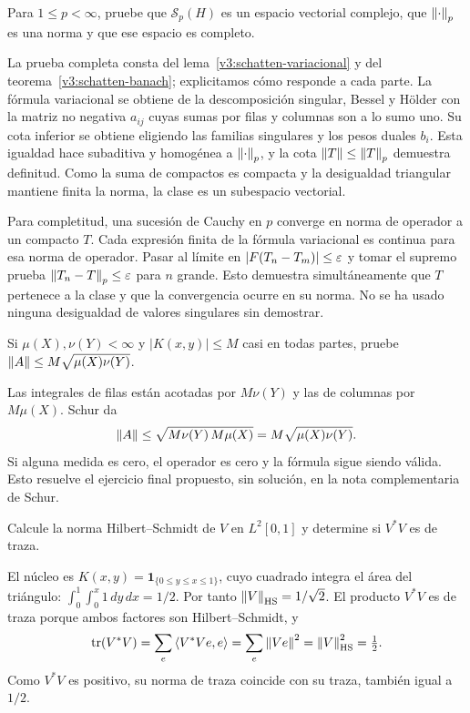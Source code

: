 \begin{ejercicio}\label{ej:v3-l12-6}
Para $1\le p<\infty$, pruebe que $\mathcal S_p(H)$ es un espacio vectorial complejo, que $\left\lVert\cdot\right\rVert_p$ es una norma y que ese espacio es completo.
\end{ejercicio}
\begin{solucion}
La prueba completa consta del lema~\ref{v3:schatten-variacional} y del teorema~\ref{v3:schatten-banach}; explicitamos cómo responde a cada parte. La fórmula variacional se obtiene de la descomposición singular, Bessel y Hölder con la matriz no negativa $a_{ij}$ cuyas sumas por filas y columnas son a lo sumo uno. Su cota inferior se obtiene eligiendo las familias singulares y los pesos duales $b_i$. Esta igualdad hace subaditiva y homogénea a $\left\lVert\cdot\right\rVert_p$, y la cota $\left\lVert T\right\rVert\le\left\lVert T\right\rVert_p$ demuestra definitud. Como la suma de compactos es compacta y la desigualdad triangular mantiene finita la norma, la clase es un subespacio vectorial.

Para completitud, una sucesión de Cauchy en $p$ converge en norma de operador a un compacto $T$. Cada expresión finita de la fórmula variacional es continua para esa norma de operador. Pasar al límite en $|F(T_n-T_m)|\le\varepsilon$ y tomar el supremo prueba $\left\lVert T_n-T\right\rVert_p\le\varepsilon$ para $n$ grande. Esto demuestra simultáneamente que $T$ pertenece a la clase y que la convergencia ocurre en su norma. No se ha usado ninguna desigualdad de valores singulares sin demostrar.
\end{solucion}

\begin{ejercicio}\label{ej:v3-ampl-schur}
Si $\mu(X),\nu(Y)<\infty$ y $|K(x,y)|\le M$ casi en todas partes, pruebe $\left\lVert A\right\rVert\le M\sqrt{\mu(X)\nu(Y)}$.
\end{ejercicio}
\begin{solucion}
Las integrales de filas están acotadas por $M\nu(Y)$ y las de columnas por $M\mu(X)$. Schur da
\[\left\lVert A\right\rVert\le\sqrt{M\nu(Y)\,M\mu(X)}=M\sqrt{\mu(X)\nu(Y)}.
\]
Si alguna medida es cero, el operador es cero y la fórmula sigue siendo válida. Esto resuelve el ejercicio final propuesto, sin solución, en la nota complementaria de Schur.
\end{solucion}

\begin{ejercicio}\label{ej:v3-ampl-volterra-hs}
Calcule la norma Hilbert--Schmidt de $V$ en $L^2[0,1]$ y determine si $V^*V$ es de traza.
\end{ejercicio}
\begin{solucion}
El núcleo es $K(x,y)=\boldsymbol1_{\{0\le y\le x\le1\}}$, cuyo cuadrado integra el área del triángulo: $\int_0^1\int_0^x1\,dy\,dx=1/2$. Por tanto $\left\lVert V\right\rVert_{\mathrm{HS}}=1/\sqrt2$. El producto $V^*V$ es de traza porque ambos factores son Hilbert--Schmidt, y
\[\operatorname{tr}(V^*V)=\sum_e\left\langle V^*Ve,e\right\rangle=\sum_e\left\lVert Ve\right\rVert^2=\left\lVert V\right\rVert_{\mathrm{HS}}^2=\tfrac12.
\]
Como $V^*V$ es positivo, su norma de traza coincide con su traza, también igual a $1/2$.
\end{solucion}

